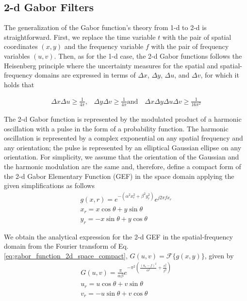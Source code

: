 \documentclass[journal]{IEEEtran}
\begin{document}
\subsection{2-d Gabor Filters}
The generalization of the Gabor function's theory from 1-d to 2-d is straightforward. First, we replace the time variable $t$ with the pair of spatial coordinates $(x, y)$ and the frequency variable $f$ with the pair of frequency variables $(u, v)$. Then, as for the 1-d case, the 2-d Gabor functions follows the Heisenberg principle where the uncertainty measures for the spatial and spatial-frequency domains are expressed in terms of $\Delta x$, $\Delta y$, $\Delta u$, and $\Delta v$, for which it holds that

\begin{equation}\label{eq:uncertainty_principle_2d}
    \begin{gathered}
        \Delta x\Delta u \geq \frac{1}{4\pi}\textrm{,} \quad \Delta y\Delta v \geq \frac{1}{4\pi}\textrm{and} \quad \Delta x \Delta y \Delta u \Delta v \geq \frac{1}{16\pi^2}
    \end{gathered}
\end{equation}

The 2-d Gabor function is represented by the modulated product of a harmonic oscillation with a pulse in the form of a probability function. The harmonic oscillation is represented by a complex exponential on any spatial frequency and any orientation; the pulse is represented by an elliptical Gaussian ellipse on any orientation. For simplicity, we assume that the orientation of the Gaussian and the harmonic modulation are the same and, therefore, define a compact form of the 2-d Gabor Elementary Function (GEF) in the space domain applying the given simplifications as follows
\begin{equation}\label{eq:gabor_function_2d_space_compact}
    \begin{gathered}
        g(x, r) =  e ^{-\left(\alpha^2 x_r^2 + \beta^2 y_r^2\right)} e ^{j 2 \pi f x_r } \\
        x_r = x \cos{\theta} + y \sin{\theta}\\
        y_r = -x \sin{\theta} + y \cos{\theta}
     \end{gathered}
\end{equation}

We obtain the analytical expression for the 2-d GEF in the spatial-frequency domain from the Fourier transform of Eq. \eqref{eq:gabor_function_2d_space_compact}, $G(u, v) = \mathcal{F}\{g(x, y)\}$, given by 
\begin{equation}\label{eq:gabor_function_2d_frequency_compact}
    \begin{gathered}
        G(u, v) =  \frac{\pi}{\alpha \beta} e ^{- \pi^2 \left(\frac{\left( u_r - f\right)^2}{\alpha^2} + \frac{v_r^2}{\beta^2}\right)} \\
        u_r = u \cos{\theta} + v \sin{\theta}\\
        v_r = -u \sin{\theta} + v \cos{\theta}
     \end{gathered}
\end{equation}
\end{document}
